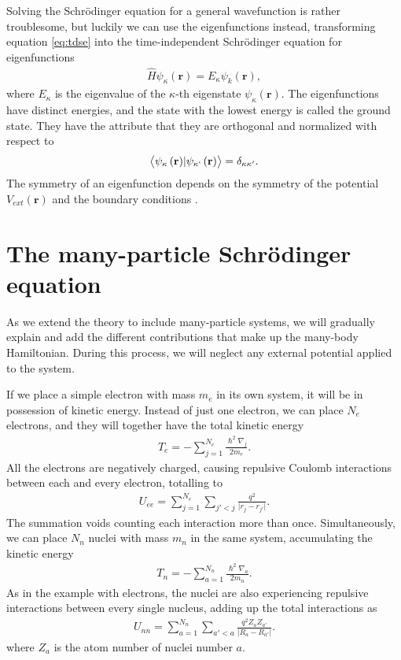  Solving the Schrödinger equation for a general wavefunction is rather troublesome, but luckily we can use the eigenfunctions instead, transforming equation \ref{eq:tdse} into the time-independent Schrödinger equation for eigenfunctions
\begin{align}
  \hat{H}\psi_\kappa(\textbf{r}) = E_\kappa \psi_k(\textbf{r}),
\end{align}
where $E_\kappa$ is the eigenvalue of the $\kappa$-th eigenstate $\psi_\kappa(\textbf{r})$. The eigenfunctions have distinct energies, and the state with the lowest energy is called the ground state. They have the attribute that they are orthogonal and normalized with respect to
\begin{align}
  \left \langle \psi_\kappa \left(\textbf{r}\right) \rvert \psi_{\kappa`} \left(\textbf{r} \right) \right \rangle = \delta_{\kappa \kappa'}.
\end{align}
The symmetry of an eigenfunction depends on the symmetry of the potential $V_{ext}(\textbf{r})$ and the boundary conditions \cite{Persson2020}.

\section{The many-particle Schrödinger equation}
As we extend the theory to include many-particle systems, we will gradually explain and add the different contributions that make up the many-body Hamiltonian. During this process, we will neglect any external potential applied to the system.

If we place a simple electron with mass $m_e$ in its own system, it will be in  possession of kinetic energy. Instead of just one electron, we can place $N_e$ electrons, and they will together have the total kinetic energy
\begin{align}
  T_e = - \sum_{j=1}^{N_e} \frac{\hslash^2\nabla_j}{2m_e}.
\end{align}
All the electrons are negatively charged, causing repulsive Coulomb interactions between each and every electron, totalling to
\begin{align}
  U_{ee} = \sum_{j=1}^{N_e}\sum_{j'<j} \frac{q^2}{\lvert r_j - r_{j'}\rvert}.
  \label{eq:electron-electron}
\end{align}
The summation voids counting each interaction more than once. Simultaneously, we can place $N_n$ nuclei with mass $m_n$ in the same system, accumulating the kinetic energy
\begin{align}
  T_n = - \sum_{a=1}^{N_n} \frac{\hslash^2\nabla_a}{2m_n}.
\end{align}
As in the example with electrons, the nuclei are also experiencing repulsive interactions between every single nucleus, adding up the total interactions as
\begin{align}
  U_{nn} = \sum_{a=1}^{N_n}\sum_{a'<a} \frac{q^2 Z_aZ_{a'}}{\lvert R_a - R_{a'}\rvert }.
\end{align}
where $Z_a$ is the atom number of nuclei number $a$.

